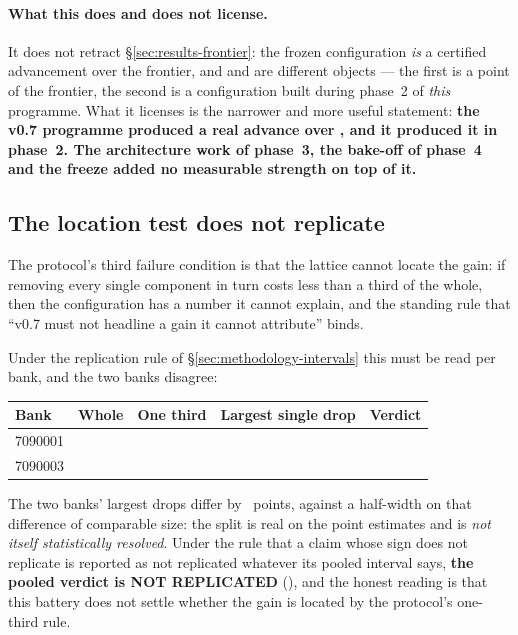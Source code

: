 \paragraph{What this does and does not license.} It does not retract
\S\ref{sec:results-frontier}: the frozen configuration \emph{is} a certified advancement over the
\vsix{} frontier, and \fcheap{} and \composite{} are different objects --- the first is a point of the
\vsix{} frontier, the second is a configuration built during phase~2 of \emph{this} programme. What it
licenses is the narrower and more useful statement: \textbf{the v0.7 programme produced a real
advance over \vsix{}, and it produced it in phase~2. The architecture work of phase~3, the bake-off of
phase~4 and the freeze added no measurable strength on top of it.}

\subsection{The location test does not replicate}
\label{sec:against-location}

The protocol's third failure condition is that the lattice cannot locate the gain: if removing every
single component in turn costs less than a third of the whole, then the configuration has a number it
cannot explain, and the standing rule that ``v0.7 must not headline a gain it cannot attribute'' binds.

Under the replication rule of \S\ref{sec:methodology-intervals} this must be read per bank, and the two
banks disagree:

\begin{center}\small
\begin{tabular}{lrrlc}
\toprule
Bank & Whole & One third & Largest single drop & Verdict \\
\midrule
7090001 & \vsevenLocWholeOne{} & \vsevenLocThirdOne{} & \texttt{\vsevenLocAtOne{}} \vsevenLocBiggestOne{} & \vsevenLocVerdictOne{} \\
7090003 & \vsevenLocWholeThree{} & \vsevenLocThirdThree{} & \texttt{\vsevenLocAtThree{}} \vsevenLocBiggestThree{} & \vsevenLocVerdictThree{} \\
\bottomrule
\end{tabular}
\end{center}

The two banks' largest drops differ by \vsevenLocSplit{}~points, against a half-width on that
difference of comparable size: the split is real on the point estimates and is \emph{not itself
statistically resolved}. Under the rule that a claim whose sign does not replicate is reported as not
replicated whatever its pooled interval says, \textbf{the pooled verdict is NOT REPLICATED}
(\vsevenLocReplicates{}), and the honest reading is that this battery does not settle whether the gain
is located by the protocol's one-third rule.


